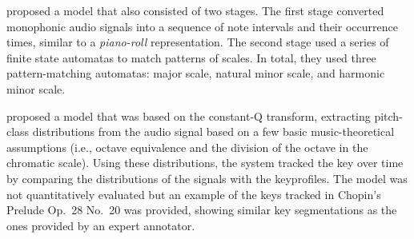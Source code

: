 
\textcite{izmirli1994recognition} proposed a model that also
consisted of two stages. The first stage converted
monophonic audio signals into a sequence of note intervals
and their occurrence times, similar to a \emph{piano-roll}
representation. The second stage used a series of finite
state automatas to match patterns of scales. In total, they
used three pattern-matching automatas: major scale, natural
minor scale, and harmonic minor scale.


\textcite{purwins2000new} proposed a model that was based on
the constant-Q transform, extracting pitch-class
distributions from the audio signal based on a few basic
music-theoretical assumptions (i.e., octave equivalence and
the division of the octave in the chromatic scale). Using
these distributions, the system tracked the key over time by
comparing the distributions of the signals with the
\textcite{krumhansl1982tracing} \gls{keyprofile}s. The model
was not quantitatively evaluated but an example of the keys
tracked in Chopin's Prelude Op.~28 No.~20 was provided,
showing similar key segmentations as the ones provided by an
expert annotator.


